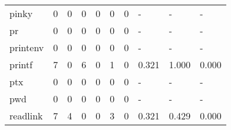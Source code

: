 \begin{longtable}{lp{1.3cm}p{1.3cm}p{1.3cm}p{1.3cm}p{1.3cm}p{1.3cm}p{1.3cm}p{1.3cm}p{1.3cm}}
pinky     &                      0 &                                  0 &                                 0 &                                0 &                                 0 &                               0 &                                    - &                                      - &                                    - \\
pr        &                      0 &                                  0 &                                 0 &                                0 &                                 0 &                               0 &                                    - &                                      - &                                    - \\
printenv  &                      0 &                                  0 &                                 0 &                                0 &                                 0 &                               0 &                                    - &                                      - &                                    - \\
printf    &                      7 &                                  0 &                                 6 &                                0 &                                 1 &                               0 &                                0.321 &                                  1.000 &                                0.000 \\
ptx       &                      0 &                                  0 &                                 0 &                                0 &                                 0 &                               0 &                                    - &                                      - &                                    - \\
pwd       &                      0 &                                  0 &                                 0 &                                0 &                                 0 &                               0 &                                    - &                                      - &                                    - \\
readlink  &                      7 &                                  4 &                                 0 &                                0 &                                 3 &                               0 &                                0.321 &                                  0.429 &                                0.000 \\

\end{longtable}

